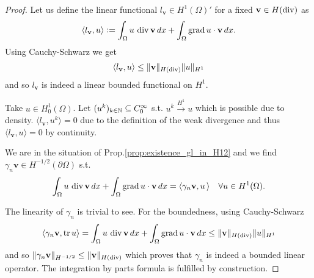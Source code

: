 \documentclass[../master_thesis.tex]{subfiles}
\begin{document}
\begin{proof}
    Let us define 
    the linear functional $l_\mathbf{v} \in H^1(\Omega)'$ for a fixed $\mathbf{v} \in H(\operatorname{div})$
    as
    \begin{align*}
        \langle l_\mathbf{v}, u \rangle \vcentcolon= \int_\Omega u \, \operatorname{div} \mathbf{v} \, dx 
         + \int_\Omega \operatorname{grad} u \cdot \mathbf{v} \, dx.
    \end{align*}
    Using Cauchy-Schwarz we get
    \begin{align*}
        \langle l_\mathbf{v}, u \rangle 
        \leq \lVert \mathbf{v} \rVert _{H(\operatorname{div})} \lVert u \rVert _{H^1} 
    \end{align*}
    and so $l_\mathbf{v}$ is indeed a linear bounded functional on $H^1$.
    
    Take $u \in H^1_0(\Omega)$. 
    Let $(u^k)_{k\in \mathbb{N}} \subseteq C^\infty_0$ s.t. 
    $u^k \xrightarrow{H^1} u$ which is possible due to density. 
    $\langle l_\mathbf{v}, u^k \rangle  = 0$  due to the 
    definition of the weak divergence and thus $\langle l_\mathbf{v}, u \rangle = 0$
    by continuity.

    We are in the situation of Prop.\ref{prop:existence_gl_in_H12} 
    and we find $\gamma_n \mathbf{v} \in H^{-1/2}(\partial \Omega)$ 
    s.t. 
    \begin{align*}
        \int_\Omega u \, \operatorname{div} \mathbf{v} \, dx 
        + \int_\Omega \operatorname{grad} u \cdot \mathbf{v} \, dx 
        = \langle \gamma_n \mathbf{v}, u \, \rangle \quad \forall u \in H^1(\Omega).
    \end{align*}
    
    The linearity of $\gamma_n$ is trivial to see.
    For the boundedness, using Cauchy-Schwarz 
    \begin{align*}
        \langle \gamma_n \mathbf{v}, \operatorname{tr} u \rangle 
        = \int_\Omega u \, \operatorname{div} \mathbf{v} \, dx 
            + \int_\Omega \operatorname{grad} u \cdot \mathbf{v} \, dx
        \leq \lVert \mathbf{v} \rVert _{H(\operatorname{div})} \lVert u \rVert _{H^1}
    \end{align*}
    and so $\lVert \gamma_n \mathbf{v} \rVert _{H^{-1/2}} \leq \lVert \mathbf{v} \rVert _{H(\operatorname{div})}$
    which proves that $\gamma_n$ is indeed a bounded linear operator. The integration
    by parts formula is fulfilled by construction. 


\end{proof}
\end{document}
